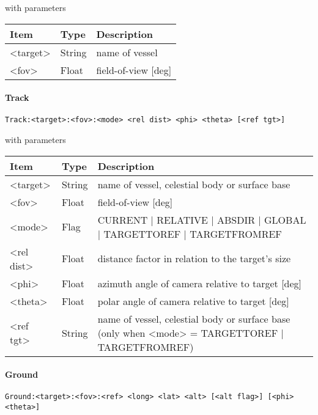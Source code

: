 \documentclass[Orbiter Developer Manual.tex]{subfiles}
\begin{document}
\noindent
with parameters

\begin{table}[H]
	\centering
	\begin{tabularx}{\textwidth}{ |l|l|X| }
	\hline\rule{0pt}{2ex}
	\textbf{Item} & \textbf{Type} & \textbf{Description}\\
	\hline\rule{0pt}{2ex}
	<target> & String & name of vessel\\
	\hline\rule{0pt}{2ex}
	<fov> & Float & field-of-view [deg]\\
	\hline
	\end{tabularx}
\end{table}

\paragraph{Track}
\begin{lstlisting}[language=OSFS]
Track:<target>:<fov>:<mode> <rel dist> <phi> <theta> [<ref tgt>]
\end{lstlisting}

\noindent
with parameters

\begin{table}[H]
	\centering
	\begin{tabularx}{\textwidth}{ |l|l|X| }
	\hline\rule{0pt}{2ex}
	\textbf{Item} & \textbf{Type} & \textbf{Description}\\
	\hline\rule{0pt}{2ex}
	<target> & String & name of vessel, celestial body or surface base\\
	\hline\rule{0pt}{2ex}
	<fov> & Float & field-of-view [deg]\\
	\hline\rule{0pt}{2ex}
	<mode> & Flag & CURRENT | RELATIVE | ABSDIR | GLOBAL | TARGETTOREF | TARGETFROMREF\\
	\hline\rule{0pt}{2ex}
	<rel dist> & Float & distance factor in relation to the target's size\\
	\hline\rule{0pt}{2ex}
	<phi> & Float & azimuth angle of camera relative to target [deg]\\
	\hline\rule{0pt}{2ex}
	<theta> & Float & polar angle of camera relative to target [deg]\\
	\hline\rule{0pt}{2ex}
	<ref tgt> & String & name of vessel, celestial body or surface base (only when <mode> = TARGETTOREF | TARGETFROMREF)\\
	\hline
	\end{tabularx}
\end{table}

\paragraph{Ground}
\begin{lstlisting}[language=OSFS]
Ground:<target>:<fov>:<ref> <long> <lat> <alt> [<alt flag>] [<phi> <theta>]
\end{lstlisting}
\end{document}
